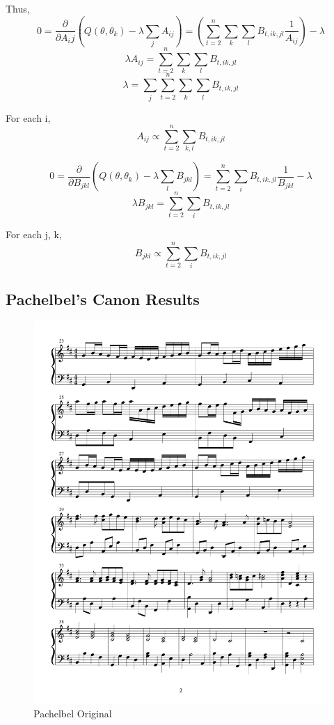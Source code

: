 \documentclass{article} %
\begin{document}
Thus, \newline
$$ 0 = \frac{\partial}{\partial A_ij}(Q(\theta, \theta_k) - \lambda \sum_{j} A_{ij}) = (\sum_{t=2}^n \sum_k \sum_l B_{t,ik,jl} \frac{1}{A_{ij}}) - \lambda$$
$$\lambda A_{ij} = \sum_{t=2}^n \sum_k \sum_l B_{t,ik,jl}$$
$$\lambda = \sum_j \sum_{t=2}^n \sum_k \sum_l B_{t,ik,jl}$$

For each i, $$A_{ij} \propto \sum_{t=2}^n \sum_{k,l} B_{t,ik,jl}$$ \newline

$$ 0 = \frac{\partial}{\partial B_{jkl}} (Q(\theta, \theta_k) - \lambda \sum_l B_{jkl}) = \sum_{t=2}^n \sum_i B_{t,ik,jl} \frac{1}{B_{jkl}} - \lambda$$
$$ \lambda B_{jkl} = \sum_{t=2}^n \sum_i B_{t,ik,jl}$$

For each j, k, \newline
$$B_{jkl} \propto \sum_{t=2}^n \sum_i B_{t,ik,jl}$$

\subsection{Pachelbel's Canon Results}

\begin{figure}[H]
\centering

\includegraphics [scale = 0.6] {PachelbelOriginal-cropped.pdf}
\caption{Pachelbel Original\label{Porig}}
\end{figure}
\end{document}
